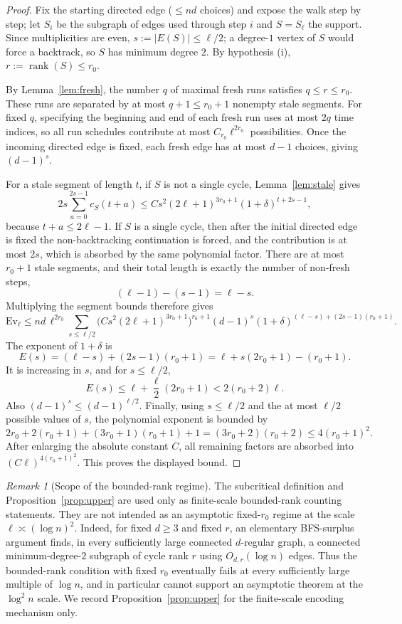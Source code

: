 \documentclass[11pt]{article}
\theoremstyle{remark}
\newtheorem{remark}[lemma]{Remark}
\begin{document}
\begin{proof}
Fix the starting directed edge ($\le nd$ choices) and expose the walk
step by step; let $S_i$ be the subgraph of edges used through step $i$
and $S=S_\ell$ the support. Since multiplicities are even,
$s:=|E(S)|\le\ell/2$; a degree-$1$ vertex of $S$ would force a
backtrack, so $S$ has minimum degree $2$. By hypothesis (i),
$r:=\operatorname{rank}(S)\le r_0$.

By Lemma~\ref{lem:fresh}, the number $q$ of maximal fresh runs satisfies
$q\le r\le r_0$. These runs are separated by at most $q+1\le r_0+1$ nonempty stale
segments. For fixed $q$, specifying the beginning and end of each fresh run uses at most
$2q$ time indices, so all run schedules contribute at most $C_{r_0}\ell^{2r_0}$ possibilities.
Once the incoming directed edge is fixed, each fresh edge has at most $d-1$ choices, giving
$(d-1)^s$.

For a stale segment of length $t$, if $S$ is not a single cycle, Lemma~\ref{lem:stale} gives
\[
2s\sum_{a=0}^{2s-1}c_S(t+a)
\le C s^2(2\ell+1)^{3r_0+1}(1+\delta)^{t+2s-1},
\]
because $t+a\le2\ell-1$. If $S$ is a single cycle, then after the initial directed edge is
fixed the non-backtracking continuation is forced, and the contribution is at most $2s$, which
is absorbed by the same polynomial factor. There are at most $r_0+1$ stale segments, and their
total length is exactly the number of non-fresh steps,
\[
(\ell-1)-(s-1)=\ell-s.
\]
Multiplying the segment bounds therefore gives
\[
\mathrm{Ev}_\ell\le nd\,\ell^{2r_0}
\sum_{s\le\ell/2}
\big(C s^2(2\ell+1)^{3r_0+1}\big)^{r_0+1}
(d-1)^s(1+\delta)^{(\ell-s)+(2s-1)(r_0+1)}.
\]
The exponent of $1+\delta$ is
\[
E(s)=(\ell-s)+(2s-1)(r_0+1)
=\ell+s(2r_0+1)-(r_0+1).
\]
It is increasing in $s$, and for $s\le\ell/2$,
\[
E(s)\le\ell+\frac{\ell}{2}(2r_0+1)<2(r_0+2)\ell.
\]
Also $(d-1)^s\le(d-1)^{\ell/2}$. Finally, using $s\le\ell/2$ and the at most $\ell/2$
possible values of $s$, the polynomial exponent is bounded by
\[
2r_0+2(r_0+1)+(3r_0+1)(r_0+1)+1
=(3r_0+2)(r_0+2)\le4(r_0+1)^2.
\]
After enlarging the absolute constant $C$, all remaining factors are absorbed into
$(C\ell)^{4(r_0+1)^2}$. This proves the displayed bound.
\end{proof}


\begin{remark}[Scope of the bounded-rank regime]\label{rem:scope}
The subcritical definition and Proposition~\ref{prop:upper} are used only as finite-scale
bounded-rank counting statements. They are not intended as an asymptotic fixed-$r_0$
regime at the scale $\ell\asymp(\log n)^2$. Indeed, for fixed $d\ge3$ and fixed $r$,
an elementary BFS-surplus argument finds, in every sufficiently large connected
$d$-regular graph, a connected minimum-degree-$2$ subgraph of cycle rank $r$ using
$O_{d,r}(\log n)$ edges. Thus the bounded-rank condition with fixed $r_0$ eventually
fails at every sufficiently large multiple of $\log n$, and in particular cannot support
an asymptotic theorem at the $\log^2 n$ scale. We record Proposition~\ref{prop:upper}
for the finite-scale encoding mechanism only.
\end{remark}
\end{document}
